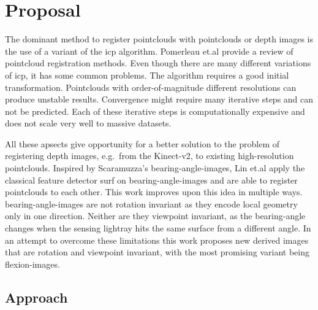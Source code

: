 \documentclass[doktyp=marbeit,fontsize=12pt,sprache=english,draft=true,hausschrift=true]{TUBAFarbeiten}
\begin{document}
\maketitle

\TUBAFErklaerungsseite%
\tableofcontents
\newpage

\printglossary[type=\acronymtype]%
\newpage

\printglossary[type=symbols]%
\glsaddallunused[symbols]
\newpage


\section{Proposal}

The dominant method to register pointclouds with pointclouds or depth
images is the use of a variant of the \gls{icp}\cite{Besl1992}
algorithm. Pomerleau et.al\cite{Pomerleau2015} provide a review of pointcloud registration methods.
Even though there are many different variations of \gls{icp}, it has
some common problems. The algorithm requires a good initial
transformation. Pointclouds with order-of-magnitude different
resolutions can produce unstable results. Convergence might require many
iterative steps and can not be predicted. Each of these iterative steps
is computationally expensive and does not scale very well to massive
datasets.

All these apsects give opportunity for a better solution to the problem
of registering depth images, e.g.~from the Kinect-v2, to existing
high-resolution pointclouds.
Inspired by Scaramuzza's \Glspl{bearing-angle-image}\cite{Scaramuzza2007}, Lin et.al\cite{Lin2017} apply the classical feature detector \gls{surf}\cite{Bay2006} on \Glspl{bearing-angle-image} and are able to register pointclouds to each other.
This work improves upon this idea in multiple ways.
\Glspl{bearing-angle-image} are not rotation invariant as they encode local geometry only in one direction.
Neither are they viewpoint invariant, as the \gls{bearing-angle} changes when the sensing lightray hits the same surface from a different angle.
In an attempt to overcome these limitations this work proposes new derived images that are rotation and viewpoint invariant, with the most promising variant being \Glspl{flexion-image}.

\subsection{Approach}\label{approach}
\end{document}
